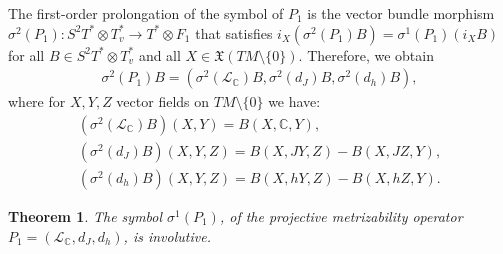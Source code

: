 \documentclass[pdftex]{sigma}
\numberwithin{equation}{section}
\newtheorem{Theorem}{Theorem}[section]
\begin{document}
The f\/irst-order prolongation of the symbol of $P_1$ is the vector
bundle morphism $\sigma^2(P_1): S^2T^*\otimes T^*_v \to T^*\otimes
F_1$ that satisf\/ies
$i_X\left(\sigma^2(P_1)B\right)=\sigma^1(P_1)(i_XB)$ for all $B\in
S^2T^*\otimes T^*_v$ and all $X\in {\mathfrak
X}(TM\setminus\{0\})$. Therefore, we obtain
\begin{gather*}
\sigma^2(P_1)B=\left( \sigma^2\left(\mathcal{L}_{\mathbb
C}\right)B, \sigma^2\left(d_J\right)B,
\sigma^2\left(d_h\right)B\right),
\end{gather*} where  for $X, Y, Z$ vector f\/ields on
$TM\setminus\{0\}$ we have:
\begin{gather} \nonumber \left(\sigma^2\left(\mathcal{L}_{\mathbb
C}\right)B\right)(X,Y)   =   B(X, \mathbb{C}, Y), \\
\label{sigma2p1} \left(\sigma^2\left(d_J\right)B\right)(X,Y,Z)   =
B(X, JY,Z)-B(X,JZ,Y), \\
\nonumber \left(\sigma^2\left(d_h\right)B\right)(X,Y,Z)   =
B(X,hY,Z)-B(X,hZ, Y).
\end{gather}
\begin{Theorem} \label{thm:inv}
The symbol $\sigma^1(P_1)$, of the projective metrizability operator $P_1=\left({\mathcal L}_{\mathbb C},
d_J, d_h \right)$, is involutive.
\end{Theorem}
\end{document}
